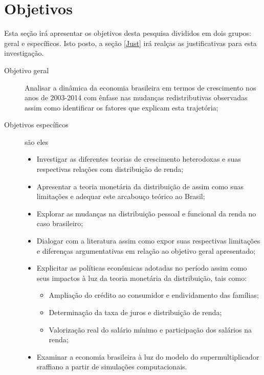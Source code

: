 \section{Objetivos}\label{OBJ}

Esta seção irá apresentar os objetivos desta pesquisa divididos em dois grupos: geral e específicos. Isto posto, a seção \ref{Just} irá realças as justificativas para esta investigação.

\begin{description}
	\item[Objetivo geral] Analisar a dinâmica da economia brasileira em termos de crescimento nos anos de 2003-2014 com ênfase nas mudanças redistributivas observadas assim como identificar os fatores que explicam esta trajetória;
	\item[Objetivos específicos] {\color{white}são eles}
	\begin{itemize}
		\item Investigar as diferentes teorias de crescimento heterodoxas e suas respectivas relações com distribuição de renda;
		\item Apresentar a teoria monetária da distribuição de \textcite{pivetti_essay_1992} assim como suas limitações e adequar este arcabouço teórico ao Brasil;
		\item Explorar as mudanças na distribuição pessoal e funcional da renda no caso brasileiro;
		\item Dialogar com a literatura assim como expor suas respectivas limitações e  diferenças argumentativas em relação ao objetivo geral apresentado;
		\item Explicitar as políticas econômicas adotadas no período assim como seus impactos à luz da teoria monetária da distribuição, tais como:
		\begin{itemize}
			\item Ampliação do crédito ao consumidor e endividamento das famílias;
			\item Determinação da taxa de juros e distribuição de renda;
			\item Valorização real do salário mínimo e participação dos salários na renda;
		\end{itemize}
		\item Examinar a economia brasileira à luz do modelo do supermultiplicador sraffiano a partir de simulações computacionais.
	\end{itemize}
\end{description}


